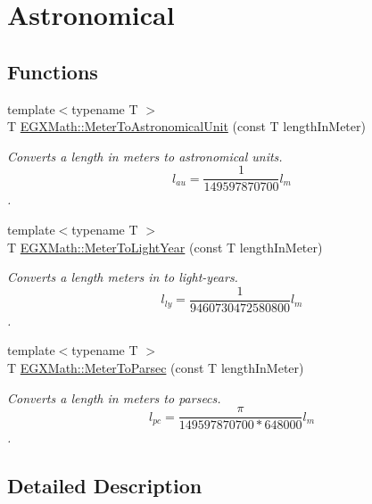 \hypertarget{group___e_g_x_math-_conversions-_length_conversions-_s_i-_meter-_astronomical}{}\section{Astronomical}
\label{group___e_g_x_math-_conversions-_length_conversions-_s_i-_meter-_astronomical}
\subsection*{Functions}
\begin{DoxyCompactItemize}
\item 
{\footnotesize template$<$typename T $>$ }\\T \mbox{\hyperlink{group___e_g_x_math-_conversions-_length_conversions-_s_i-_meter-_astronomical_gadf1e5c63bba613fab5b94704df71994d}{E\+G\+X\+Math\+::\+Meter\+To\+Astronomical\+Unit}} (const T length\+In\+Meter)
\begin{DoxyCompactList}\small\item\em Converts a length in meters to astronomical units. \[ l_{au}= \frac{1}{149597870700} l_{m} \]. \end{DoxyCompactList}\item 
{\footnotesize template$<$typename T $>$ }\\T \mbox{\hyperlink{group___e_g_x_math-_conversions-_length_conversions-_s_i-_meter-_astronomical_ga0dbb6d8e5d002475c0335934326b27d7}{E\+G\+X\+Math\+::\+Meter\+To\+Light\+Year}} (const T length\+In\+Meter)
\begin{DoxyCompactList}\small\item\em Converts a length meters in to light-\/years. \[ l_{ly}= \frac{1}{9460730472580800} l_{m} \]. \end{DoxyCompactList}\item 
{\footnotesize template$<$typename T $>$ }\\T \mbox{\hyperlink{group___e_g_x_math-_conversions-_length_conversions-_s_i-_meter-_astronomical_ga326ca8b69fece7b50052e3f319d5ce5a}{E\+G\+X\+Math\+::\+Meter\+To\+Parsec}} (const T length\+In\+Meter)
\begin{DoxyCompactList}\small\item\em Converts a length in meters to parsecs. \[ l_{pc}=\frac{\pi}{149597870700 * 648000} l_{m} \]. \end{DoxyCompactList}\end{DoxyCompactItemize}


\subsection{Detailed Description}


